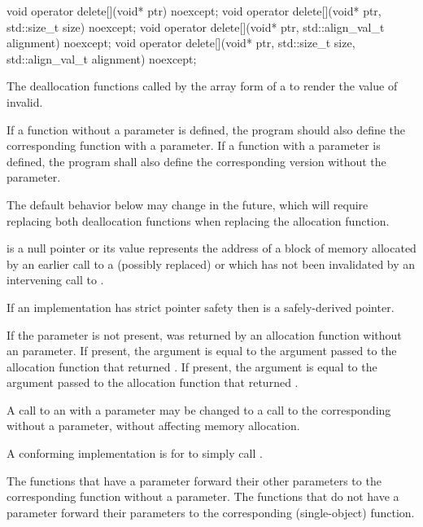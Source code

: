 %
\begin{itemdecl}
void operator delete[](void* ptr) noexcept;
void operator delete[](void* ptr, std::size_t size) noexcept;
void operator delete[](void* ptr, std::align_val_t alignment) noexcept;
void operator delete[](void* ptr, std::size_t size, std::align_val_t alignment) noexcept;
\end{itemdecl}

\begin{itemdescr}
\pnum
\effects
The
deallocation functions
called by the array form of a
to render the value of  invalid.

\pnum
\replaceable
{}
If a function without a  parameter is defined,
the program should also define
the corresponding function with a  parameter.
If a function with a  parameter is defined,
the program shall also define
the corresponding version without the  parameter.
\begin{note}
The default behavior below may change in the future, which will require
replacing both deallocation functions when replacing the allocation function.
\end{note}

\pnum
\expects
{} is a null pointer or
its value represents the address of
a block of memory allocated by
an earlier call to a (possibly replaced)
or
which has not been invalidated by an intervening call to
.

\pnum
\expects
If an implementation has strict pointer safety
then  is a safely-derived pointer.

\pnum
\expects
If the  parameter is not present,
 was returned by an allocation function
without an  parameter.
If present, the  argument
is equal to the  argument
passed to the allocation function that returned .
If present, the  argument
is equal to the  argument
passed to the allocation function that returned .

\pnum
\required
A call to an 
with a  parameter
may be changed to
a call to the corresponding 
without a  parameter,
without affecting memory allocation.
\begin{note}
A conforming implementation is for
 to simply call
.
\end{note}

\pnum
{}
The functions that have a  parameter
forward their other parameters
to the corresponding function without a  parameter.
The functions that do not have a  parameter
forward their parameters
to the corresponding  (single-object) function.
\end{itemdescr}

